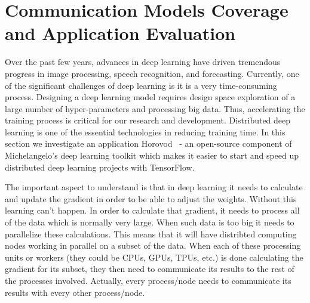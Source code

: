 \documentclass[sigconf]{acmart}
\begin{document}
\section{Communication Models Coverage and Application Evaluation}\label{sec:application}
Over the past few years, advances in deep learning have driven tremendous progress in image
processing, speech recognition, and forecasting. Currently, one of the significant challenges
of deep learning is it is a very time-consuming process. Designing a deep learning model
requires design space exploration of a large number of hyper-parameters and processing big data.
Thus, accelerating the training process is critical for our research and development.
Distributed deep learning is one of the essential technologies in reducing training time.
In this section we investigate an application Horovod~\cite{sergeev2018horovod} - an open-source component of Michelangelo's deep learning toolkit which makes it easier to start and speed
up distributed deep learning projects with TensorFlow.

The important aspect to understand is that in deep learning it needs to calculate and update the gradient
in order to be able to adjust the weights. Without this learning can't happen. In order to calculate that gradient, it needs to process all of the data which is normally very large. When such data is too big it needs to parallelize these calculations. This means that it will have distribted computing nodes working in parallel on a subset of the data. When each of these processing units or workers (they could be CPUs, GPUs, TPUs, etc.) is done calculating the gradient for its subset, they then need to communicate its results to the rest of the processes involved. Actually, every process/node needs to communicate its results with every other process/node.
\end{document}
